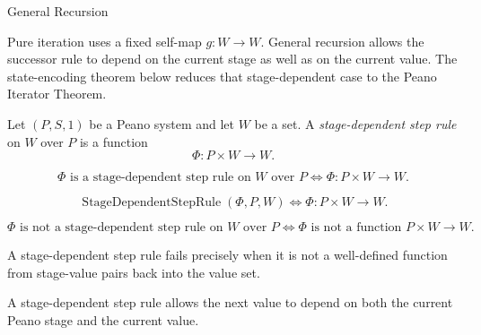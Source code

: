 \begin{topicbox}{General Recursion}
\begin{exposition}
Pure iteration uses a fixed self-map $g:W\to W$. General recursion allows the
successor rule to depend on the current stage as well as on the current value.
The state-encoding theorem below reduces that stage-dependent case to the
Peano Iterator Theorem.
\end{exposition}

\begin{tcolorbox}[colback=defbox, colframe=defborder, arc=2pt,
  left=6pt, right=6pt, top=4pt, bottom=4pt,
  title={\small\textbf{Definition (Stage-Dependent Step Rule)}},
  fonttitle=\small\bfseries]
\begin{definition}
\label{def:stage-dependent-step-rule}
Let $(P,S,1)$ be a Peano system and let $W$ be a set. A
\emph{stage-dependent step rule} on $W$ over $P$ is a function
\[
\Phi:P\times W\to W.
\]
\end{definition}
\end{tcolorbox}

\begin{remark*}
\[
\Phi \text{ is a stage-dependent step rule on } W \text{ over } P
\Longleftrightarrow
\Phi:P\times W\to W.
\]
\end{remark*}

\begin{remark*}
\[
\operatorname{StageDependentStepRule}(\Phi,P,W)
\Longleftrightarrow
\Phi:P\times W\to W.
\]
\end{remark*}

\begin{remark*}
\[
\Phi \text{ is not a stage-dependent step rule on } W \text{ over } P
\Longleftrightarrow
\Phi \text{ is not a function } P\times W\to W.
\]
\end{remark*}

\begin{remark*}
A stage-dependent step rule fails precisely when it is not a well-defined
function from stage-value pairs back into the value set.
\end{remark*}

\begin{remark*}[Interpretation]
A stage-dependent step rule allows the next value to depend on both the
current Peano stage and the current value.
\end{remark*}


\end{topicbox}
